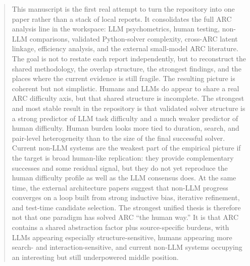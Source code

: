 \begin{abstract}
This manuscript is the first real attempt to turn the repository into one paper rather than a stack of local reports. It consolidates the full ARC analysis line in the workspace: LLM psychometrics, human testing, non-LLM comparisons, validated Python-solver complexity, cross-ARC latent linkage, efficiency analysis, and the external small-model ARC literature. The goal is not to restate each report independently, but to reconstruct the shared methodology, the overlap structure, the strongest findings, and the places where the current evidence is still fragile. The resulting picture is coherent but not simplistic. Humans and LLMs do appear to share a real ARC difficulty axis, but that shared structure is incomplete. The strongest and most stable result in the repository is that validated solver structure is a strong predictor of LLM task difficulty and a much weaker predictor of human difficulty. Human burden looks more tied to duration, search, and pair-level heterogeneity than to the size of the final successful solver. Current non-LLM systems are the weakest part of the empirical picture if the target is broad human-like replication: they provide complementary successes and some residual signal, but they do not yet reproduce the human difficulty profile as well as the LLM consensus does. At the same time, the external architecture papers suggest that non-LLM progress converges on a loop built from strong inductive bias, iterative refinement, and test-time candidate selection. The strongest unified thesis is therefore not that one paradigm has solved ARC ``the human way.'' It is that ARC contains a shared abstraction factor plus source-specific burdens, with LLMs appearing especially structure-sensitive, humans appearing more search- and interaction-sensitive, and current non-LLM systems occupying an interesting but still underpowered middle position.
\end{abstract}

\tableofcontents
\clearpage
